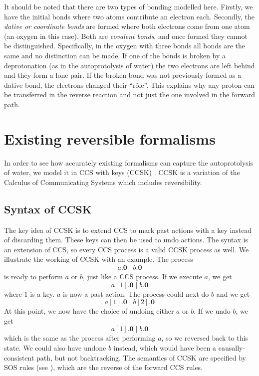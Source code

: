 \documentclass[runningheads]{llncs}
\newcommand{\paral}{\; \vert \;}
\newcommand{\Nil}{\mathbf{0}}
\begin{document}
It should be noted that there are two types of bonding modelled here. Firstly, we have the initial bonds where two atoms contribute an electron each. Secondly, the \emph{dative or coordinate bonds} are formed where both electrons come from one atom (an oxygen in this case). Both are \emph{covalent bonds}, and once formed they cannot be distinguished. Specifically, in the oxygen with three bonds all bonds are the same and no distinction can be made. If one of the bonds is broken by a deprotonation (as in the autoprotolysis of water) the two electrons are left behind and they form a lone pair. If the broken bond was not previously formed as a dative bond, the electrons changed their ``r\^{o}le''. This explains why any proton can be transferred in the reverse reaction and not just the one involved in the forward path.

\section{Existing reversible formalisms}
In order to see how accurately existing formalisms can capture the autoprotolysis of water, we model it in CCS with keys (CCSK) \cite{Irek2007}. CCSK is a variation of the Calculus of Communicating Systems which includes reversibility. 

\subsection{Syntax of CCSK}

The key idea of CCSK is to extend CCS to mark past actions with a key instead of discarding them. These keys can then be used to undo actions. The syntax is an extension of CCS, so every CCS process is a valid CCSK process as well. We illustrate the working of CCSK with an example. The process
%
$$a.\Nil \paral b.\Nil$$
%
is ready to perform $a$ or $b$, just like a CCS process. If we execute $a$, we get
%
$$a[1].\Nil \paral b.\Nil$$
%
where $1$ is a key. $a$ is now a past action. The process could next do $b$ and we get
%
$$a[1].\Nil \paral b[2].\Nil$$
%
At this point, we now have the choice of undoing either $a$ or $b$. If we undo $b$, we get
%
$$a[1].\Nil \paral b.\Nil$$
%
which is the same as the process after performing $a$, so we reversed back to this state. We could also have undone $b$ instead, which would have been a causally-consistent path, but not backtracking. The semantics of CCSK are specified by SOS rules (see \cite{Irek2007}), which are the reverse of the forward CCS rules.
\end{document}

